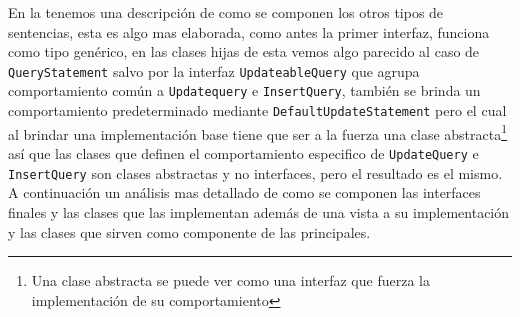En la  tenemos una descripción de como se componen los otros tipos de sentencias, esta es algo mas elaborada, como antes la primer interfaz, funciona como tipo genérico, en las clases hijas de esta vemos algo parecido al caso de \verb=QueryStatement= salvo por la interfaz \verb=UpdateableQuery= que agrupa comportamiento común a \verb=Updatequery= e \verb=InsertQuery=, también se brinda un comportamiento predeterminado mediante \verb=DefaultUpdateStatement= pero el cual al brindar una implementación base tiene que ser a la fuerza una clase abstracta\footnote{Una clase abstracta se puede ver como una interfaz que fuerza la implementación de su comportamiento} así que las clases que definen el comportamiento especifico de \verb=UpdateQuery= e \verb=InsertQuery= son clases abstractas y no interfaces, pero el resultado es el mismo. A continuación un análisis mas detallado de como se componen las interfaces finales y las clases que las implementan además de una vista a su implementación y las clases que sirven como componente de las principales.

